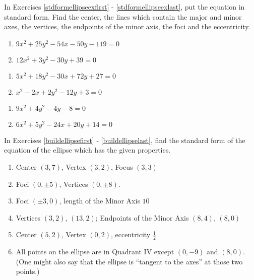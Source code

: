 In Exercises \ref{stdformellipseexfirst} - \ref{stdformellipseexlast}, put the equation in standard form.   Find the center, the lines which contain the major and minor axes, the vertices, the endpoints of the minor axis, the foci and the eccentricity.

\begin{multicols}{2}
\begin{enumerate}
\setcounter{enumi}{\value{HW}}

\item $9x^2+25y^2-54x-50y-119=0$  \label{stdformellipseexfirst}
\item $12x^{2} + 3y^{2} - 30y + 39 = 0$

\setcounter{HW}{\value{enumi}}
\end{enumerate}
\end{multicols}

\begin{multicols}{2}
\begin{enumerate}
\setcounter{enumi}{\value{HW}}

\item $5x^{2} + 18y^{2} - 30x + 72y + 27 = 0$
\item $x^2 - 2x + 2y^2 - 12y + 3 = 0$


\setcounter{HW}{\value{enumi}}
\end{enumerate}
\end{multicols}

\begin{multicols}{2}
\begin{enumerate}
\setcounter{enumi}{\value{HW}}

\item $9x^2 + 4y^2 - 4y - 8 = 0$
\item $6x^2+5y^2-24x+20y+14=0$  \label{stdformellipseexlast}

\setcounter{HW}{\value{enumi}}
\end{enumerate}
\end{multicols}


In Exercises \ref{buildellipsefirst} - \ref{buildellipselast},  find the standard form of the equation of the ellipse which has the given properties.

\begin{enumerate}
\setcounter{enumi}{\value{HW}}

\item Center $(3, 7)$, Vertex $(3, 2)$, Focus $(3, 3)$  \label{buildellipsefirst}
\item Foci $(0, \pm 5)$, Vertices $(0, \pm 8)$.
\item Foci $(\pm 3, 0)$, length of the Minor Axis $10$
\item Vertices $(3,2)$, $(13,2)$; Endpoints of the Minor Axis $(8,4)$, $(8,0)$
\item Center $(5,2)$, Vertex $(0,2)$, eccentricity $\frac{1}{2}$
\item All points on the ellipse are in Quadrant IV except $(0, -9)$ and $(8, 0)$.  (One might also say that the ellipse is ``tangent to the axes'' at those two points.)  \label{buildellipselast}

\setcounter{HW}{\value{enumi}}
\end{enumerate}

